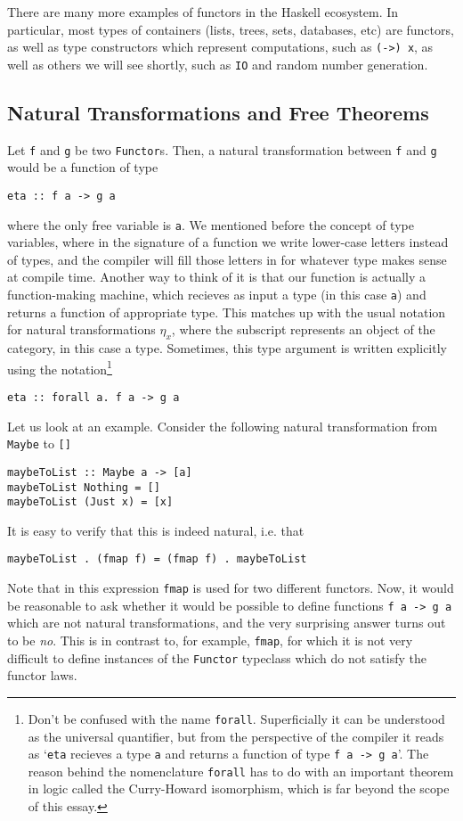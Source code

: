 \documentclass[11pt]{article}
\theoremstyle{nonumberplain}
\newcommand*\lsin{\lstinline}
\begin{document}
There are many more examples of functors in the Haskell ecosystem. In particular, most types of containers (lists, trees, sets, databases, etc) are functors, as well as type constructors which represent computations, such as \lsin|(->) x|, as well as others we will see shortly, such as \lsin|IO| and random number generation.

\subsection{Natural Transformations and Free Theorems}

Let \lsin|f| and \lsin|g| be two \lsin|Functor|s. Then, a natural transformation between \lsin|f| and \lsin|g| would be a function of type
\begin{lstlisting}
eta :: f a -> g a
\end{lstlisting}
where the only free variable is \lsin|a|. We mentioned before the concept of type variables, where in the signature of a function we write lower-case letters instead of types, and the compiler will fill those letters in for whatever type makes sense at compile time. Another way to think of it is that our function is actually a function-making machine, which recieves as input a type (in this case \lsin|a|) and returns a function of appropriate type. This matches up with the usual notation for natural transformations $\eta_x$, where the subscript represents an object of the category, in this case a type. Sometimes, this type argument is written explicitly using the notation\footnote{Don't be confused with the name \lsin|forall|. Superficially it can be understood as the universal quantifier, but from the perspective of the compiler it reads as `\lsin|eta| recieves a type \lsin|a| and returns a function of type \lsin|f a -> g a|'. The reason behind the nomenclature \lsin|forall| has to do with an important theorem in logic called the Curry-Howard isomorphism, which is far beyond the scope of this essay.}
\begin{lstlisting}
eta :: forall a. f a -> g a
\end{lstlisting}

Let us look at an example. Consider the following natural transformation from \lsin|Maybe| to \lsin|[]|
\begin{lstlisting}
maybeToList :: Maybe a -> [a]
maybeToList Nothing = []
maybeToList (Just x) = [x]
\end{lstlisting}

It is easy to verify that this is indeed natural, i.e. that
\begin{lstlisting}
maybeToList . (fmap f) = (fmap f) . maybeToList
\end{lstlisting}
Note that in this expression \lsin|fmap| is used for two different functors. Now, it would be reasonable to ask whether it would be possible to define functions \lsin|f a -> g a| which are not natural transformations, and the very surprising answer turns out to be \emph{no}. This is in contrast to, for example, \lsin|fmap|, for which it is not very difficult to define instances of the \lsin|Functor| typeclass which do not satisfy the functor laws.
\end{document}
